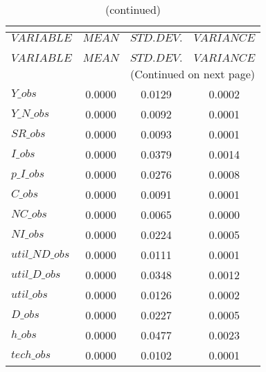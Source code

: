  
\begin{center}
\begin{longtable}{lccc} 
\caption{THEORETICAL MOMENTS}\\
 \label{Table:th_moments}\\
\toprule 
$VARIABLE       $	 & 	 $         MEAN$	 & 	 $    STD. DEV.$	 & 	 $     VARIANCE$\\
\midrule \endfirsthead 
\caption{(continued)}\\
 \toprule \\ 
$VARIABLE       $	 & 	 $         MEAN$	 & 	 $    STD. DEV.$	 & 	 $     VARIANCE$\\
\midrule \endhead 
\midrule \multicolumn{4}{r}{(Continued on next page)} \\ \bottomrule \endfoot 
\bottomrule \endlastfoot 
$Y\_obs         $	 & 	       0.0000	 & 	       0.0129	 & 	       0.0002 \\ 
$Y\_N\_obs      $	 & 	       0.0000	 & 	       0.0092	 & 	       0.0001 \\ 
$SR\_obs        $	 & 	       0.0000	 & 	       0.0093	 & 	       0.0001 \\ 
$I\_obs         $	 & 	       0.0000	 & 	       0.0379	 & 	       0.0014 \\ 
$p\_I\_obs      $	 & 	       0.0000	 & 	       0.0276	 & 	       0.0008 \\ 
$C\_obs         $	 & 	       0.0000	 & 	       0.0091	 & 	       0.0001 \\ 
$NC\_obs        $	 & 	       0.0000	 & 	       0.0065	 & 	       0.0000 \\ 
$NI\_obs        $	 & 	       0.0000	 & 	       0.0224	 & 	       0.0005 \\ 
$util\_ND\_obs  $	 & 	       0.0000	 & 	       0.0111	 & 	       0.0001 \\ 
$util\_D\_obs   $	 & 	       0.0000	 & 	       0.0348	 & 	       0.0012 \\ 
$util\_obs      $	 & 	       0.0000	 & 	       0.0126	 & 	       0.0002 \\ 
$D\_obs         $	 & 	       0.0000	 & 	       0.0227	 & 	       0.0005 \\ 
$h\_obs         $	 & 	       0.0000	 & 	       0.0477	 & 	       0.0023 \\ 
$tech\_obs      $	 & 	       0.0000	 & 	       0.0102	 & 	       0.0001 \\ 
\end{longtable}
 \end{center}
